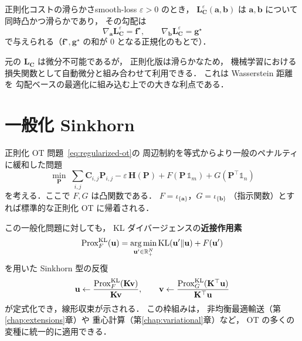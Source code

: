 \begin{proposition}{正則化コストの滑らかさ}{smooth-loss}
$\varepsilon > 0$ のとき，
$\mathbf{L}^\varepsilon_{\mathbf{C}}(\mathbf{a}, \mathbf{b})$ は
$\mathbf{a}, \mathbf{b}$ について同時凸かつ滑らかであり，
その勾配は
\[
  \nabla_{\mathbf{a}} \mathbf{L}^\varepsilon_{\mathbf{C}}
  = \mathbf{f}^\star,
  \qquad
  \nabla_{\mathbf{b}} \mathbf{L}^\varepsilon_{\mathbf{C}}
  = \mathbf{g}^\star
\]
で与えられる（$\mathbf{f}^\star, \mathbf{g}^\star$ の和が $0$ となる正規化のもとで）．
\end{proposition}

元の $\mathbf{L_C}$ は微分不可能であるが，
正則化版は滑らかなため，
機械学習における損失関数として自動微分と組み合わせて利用できる．
これは Wasserstein 距離を
勾配ベースの最適化に組み込む上での大きな利点である．


\section{一般化 Sinkhorn}\label{sec:generalized-sinkhorn}

正則化 OT 問題~\eqref{eq:regularized-ot}の
周辺制約を等式からより一般のペナルティに緩和した問題
\begin{equation}\label{eq:generalized-ot}
  \min_{\mathbf{P}} \;
  \sum_{i,j} \mathbf{C}_{i,j} \mathbf{P}_{i,j}
  - \varepsilon\, \mathbf{H}(\mathbf{P})
  + F(\mathbf{P}\, \mathbb{1}_m)
  + G(\mathbf{P}^\top \mathbb{1}_n)
\end{equation}
を考える．ここで $F, G$ は凸関数である．
$F = \iota_{\{\mathbf{a}\}}$，$G = \iota_{\{\mathbf{b}\}}$
（指示関数）とすれば標準的な正則化 OT に帰着される．

この一般化問題に対しても，
KL ダイバージェンスの\textbf{近接作用素}
\[
  \mathrm{Prox}^{\operatorname{KL}}_F(\mathbf{u})
  = \operatorname*{arg\,min}_{\mathbf{u}' \in \mathbb{R}^N_+}
  \operatorname{KL}(\mathbf{u}' \| \mathbf{u}) + F(\mathbf{u}')
\]
を用いた Sinkhorn 型の反復
\[
  \mathbf{u} \leftarrow
  \frac{\mathrm{Prox}^{\operatorname{KL}}_F(\mathbf{K}\mathbf{v})}{\mathbf{K}\mathbf{v}},
  \qquad
  \mathbf{v} \leftarrow
  \frac{\mathrm{Prox}^{\operatorname{KL}}_G(\mathbf{K}^\top \mathbf{u})}
       {\mathbf{K}^\top \mathbf{u}}
\]
が定式化でき，線形収束が示される．
この枠組みは，
非均衡最適輸送（第\ref{chap:extensions}章）や
重心計算（第\ref{chap:variational}章）など，
OT の多くの変種に統一的に適用できる．
